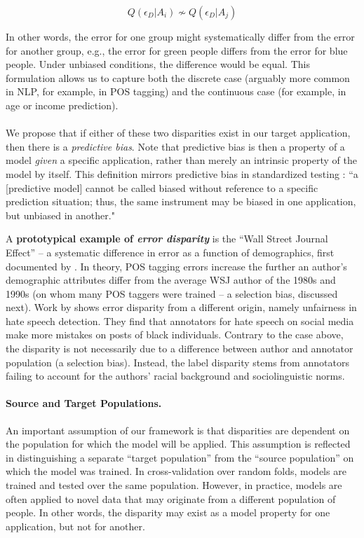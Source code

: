 \documentclass[11pt,a4paper]{article}
\begin{document}
$$Q(\epsilon_D|A_i) \nsim Q(\epsilon_D|A_j)$$

In other words, the error for one group might systematically differ from the error for another group, e.g., the error for green people differs from the error for blue people. Under unbiased conditions, the difference would be equal. This formulation allows us to capture both the discrete case (arguably more common in NLP, for example, in POS tagging) and the continuous case (for example, in age or income prediction).
\\\\
We propose that if either of these two disparities exist in our target application, then there is a \textit{predictive bias}.
Note that predictive bias is then a property of a model \textit{given} a specific application, rather than merely an intrinsic property of the model by itself. 
This definition mirrors predictive bias in standardized testing \cite{swinton1981predictive}: ``a [predictive model] cannot be called biased without reference to a specific prediction situation; thus, the same instrument may be biased in one application, but unbiased in another."

A \textbf{prototypical example of \textit{error disparity}} is the ``Wall Street Journal Effect'' -- a systematic difference in error as a function of demographics, first documented by . In theory, POS tagging errors increase the further an author's demographic attributes differ from the average WSJ author of the 1980s and 1990s (on whom many POS taggers were trained -- a selection bias, discussed next). 
Work by   shows error disparity from a different origin, namely unfairness in hate speech detection. They find that annotators for hate speech on social media make more mistakes on posts of black individuals. Contrary to the case above, the disparity is not necessarily due to a difference between author and annotator population (a selection bias). Instead, the label disparity stems from annotators failing to account for the authors' racial background and sociolinguistic norms.


\paragraph{Source and Target Populations.}
An important assumption of our framework is that disparities are dependent on the population for which the model will be applied. 
This assumption is reflected in distinguishing a separate ``target population'' from the ``source population'' on which the model was trained. 
In cross-validation over random folds, models are trained and tested over the same population. However, in practice, models are often applied to novel data that may originate from a different population of people. 
In other words, the disparity may exist as a model property for one application, but not for another. 
\end{document}
